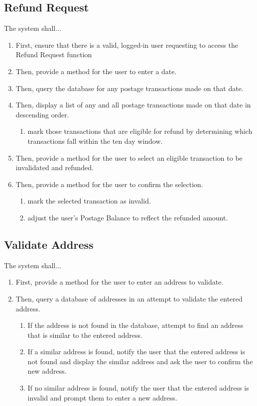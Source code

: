 \documentclass{scrreprt}
\begin{document}
\subsection{Refund Request}

The system shall...

\begin{enumerate}
\item First, ensure that there is a valid, logged-in user requesting to access
the Refund Request function
\item Then, provide a method for the user to enter a date.
\item Then, query the database for any postage transactions
made on that date.
\item Then, display a list of any and all postage transactions
made on that date in descending order.
\begin{enumerate}
\item mark those transactions that are eligible for refund by
determining which transactions fall within the ten day window.
\end{enumerate}
\item Then, provide a method for the user to select an
eligible transaction to be invalidated and refunded.
\item Then, provide a method for the user to confirm the
selection.
\begin{enumerate}
\item mark the selected transaction as invalid.
\item adjust the user’s Postage Balance to reflect the
refunded amount.
\end{enumerate}
\end{enumerate}

\subsection{Validate Address}

The system shall...

\begin{enumerate}
\item First, provide a method for the user to enter an address to validate.
\item Then, query a database of addresses in an attempt to
validate the entered address.
\begin{enumerate}
\item If the address is not found in the database, attempt to find an address
that is similar to the entered address.
\item If a similar address is found, notify the user that the entered address
is not found and display the similar address and ask the user to confirm the
new address.
\item If no similar address is found, notify the user that the entered address
is invalid and prompt them to enter a new address.
\end{enumerate}
\end{enumerate}
\end{document}
